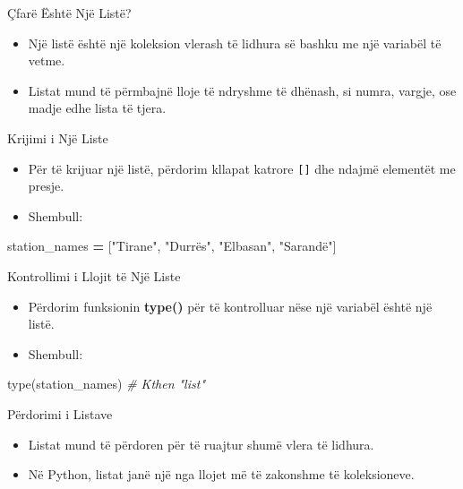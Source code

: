 \documentclass[
  ignorenonframetext,
]{beamer}
\newenvironment{Shaded}{\begin{snugshade}}{\end{snugshade}}
\newcommand{\BuiltInTok}[1]{#1}
\newcommand{\CommentTok}[1]{\textcolor[rgb]{0.56,0.35,0.01}{\textit{#1}}}
\newcommand{\NormalTok}[1]{#1}
\newcommand{\OperatorTok}[1]{\textcolor[rgb]{0.81,0.36,0.00}{\textbf{#1}}}
\newcommand{\StringTok}[1]{\textcolor[rgb]{0.31,0.60,0.02}{#1}}
\begin{document}
\begin{frame}{Çfarë Është Një Listë?}
\protect\hypertarget{uxe7faruxeb-uxebshtuxeb-njuxeb-listuxeb}{}
\begin{itemize}
\item
  Një listë është një koleksion vlerash të lidhura së bashku me një
  variabël të vetme.
\item
  Listat mund të përmbajnë lloje të ndryshme të dhënash, si numra,
  vargje, ose madje edhe lista të tjera.
\end{itemize}
\end{frame}

\begin{frame}[fragile]{Krijimi i Një Liste}
\protect\hypertarget{krijimi-i-njuxeb-liste}{}
\begin{itemize}
\item
  Për të krijuar një listë, përdorim kllapat katrore \texttt{{[}{]}} dhe
  ndajmë elementët me presje.
\item
  Shembull:
\end{itemize}

\begin{Shaded}
\begin{Highlighting}[]
\NormalTok{  station\_names }\OperatorTok{=}\NormalTok{ [}\StringTok{"Tirane"}\NormalTok{, }\StringTok{"Durrës"}\NormalTok{, }\StringTok{"Elbasan"}\NormalTok{, }\StringTok{"Sarandë"}\NormalTok{]  }
\end{Highlighting}
\end{Shaded}
\end{frame}

\begin{frame}[fragile]{Kontrollimi i Llojit të Një Liste}
\protect\hypertarget{kontrollimi-i-llojit-tuxeb-njuxeb-liste}{}
\begin{itemize}
\item
  Përdorim funksionin \textbf{type()} për të kontrolluar nëse një
  variabël është një listë.
\item
  Shembull:
\end{itemize}

\begin{Shaded}
\begin{Highlighting}[]
\BuiltInTok{type}\NormalTok{(station\_names)  }\CommentTok{\# Kthen "list"}
\end{Highlighting}
\end{Shaded}
\end{frame}

\begin{frame}{Përdorimi i Listave}
\protect\hypertarget{puxebrdorimi-i-listave}{}
\begin{itemize}
\item
  Listat mund të përdoren për të ruajtur shumë vlera të lidhura.
\item
  Në Python, listat janë një nga llojet më të zakonshme të koleksioneve.
\end{itemize}
\end{frame}
\end{document}
